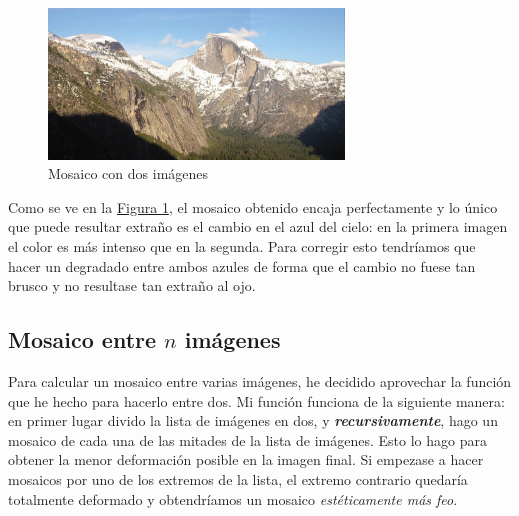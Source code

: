 \documentclass[11pt,a4paper]{article}
\theoremstyle{plain}
\theoremstyle{definition}
\begin{document}
\begin{figure}[!h]
    \centering
    \includegraphics[width=0.7\textwidth]{img14}
    \caption{Mosaico con dos imágenes}
    \label{dosimagenes}
\end{figure}

Como se ve en la \hyperref[dosimagenes]{Figura \ref*{dosimagenes}}, el mosaico obtenido encaja perfectamente y lo único que puede resultar extraño es el cambio en el azul del cielo: en la primera imagen el color es más intenso que en la segunda. Para corregir esto tendríamos que hacer un degradado entre ambos azules de forma que el cambio no fuese tan brusco y no resultase tan extraño al ojo.

\subsection{Mosaico entre $n$ imágenes}

Para calcular un mosaico entre varias imágenes, he decidido aprovechar la función que he hecho para hacerlo entre dos. Mi función funciona de la siguiente manera: en primer lugar divido la lista de imágenes en dos, y \textit{\textbf{recursivamente}}, hago un mosaico de cada una de las mitades de la lista de imágenes. Esto lo hago para obtener la menor deformación posible en la imagen final. Si empezase a hacer mosaicos por uno de los extremos de la lista, el extremo contrario quedaría totalmente deformado y obtendríamos un mosaico \textit{estéticamente más feo}.
\end{document}
